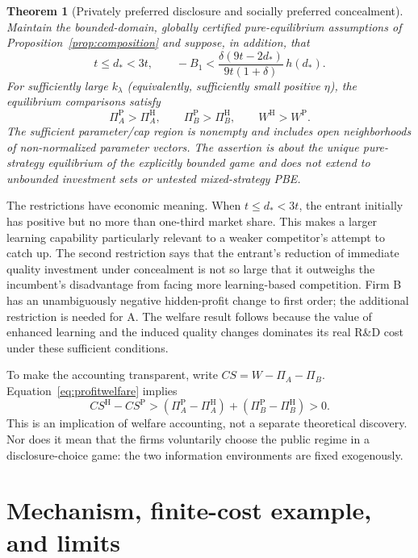 \documentclass[11pt,a4paper]{article}
\numberwithin{equation}{section}
\newtheorem{theorem}{Theorem}
\theoremstyle{remark}
\newcommand{\PP}{\mathrm{P}}
\newcommand{\HH}{\mathrm{H}}
\newcommand{\kl}{k_{\lambda}}
\begin{document}
\begin{theorem}[Privately preferred disclosure and socially preferred concealment]\label{thm:main}
Maintain the \emph{bounded-domain, globally certified pure-equilibrium} assumptions of Proposition~\ref{prop:composition} and suppose, in addition, that
\begin{equation}
t\le d_*<3t,\qquad
-B_1<
\frac{\delta(9t-2d_*)}{9t(1+\delta)}\,h(d_*).
\label{eq:Acondition}
\end{equation}
For sufficiently large $\kl$ (equivalently, sufficiently small positive $\eta$), the equilibrium comparisons satisfy
\begin{equation}
 \Pi_A^{\PP}>\Pi_A^{\HH},\qquad
 \Pi_B^{\PP}>\Pi_B^{\HH},\qquad
 W^{\HH}>W^{\PP}. \label{eq:profitwelfare}
\end{equation}
The sufficient parameter/cap region is nonempty and includes open neighborhoods of non-normalized parameter vectors. The assertion is about the unique pure-strategy equilibrium of the \emph{explicitly bounded} game and does not extend to unbounded investment sets or untested mixed-strategy PBE.
\end{theorem}

The restrictions have economic meaning. When $t\le d_*<3t$, the entrant initially has positive but no more than one-third market share. This makes a larger learning capability particularly relevant to a weaker competitor's attempt to catch up. The second restriction says that the entrant's reduction of immediate quality investment under concealment is not so large that it outweighs the incumbent's disadvantage from facing more learning-based competition. Firm B has an unambiguously negative hidden-profit change to first order; the additional restriction is needed for A. The welfare result follows because the value of enhanced learning and the induced quality changes dominates its real R\&D cost under these sufficient conditions.

To make the accounting transparent, write $CS=W-\Pi_A-\Pi_B$. Equation~\eqref{eq:profitwelfare} implies
\begin{equation}
 CS^{\HH}-CS^{\PP}>
 (\Pi_A^{\PP}-\Pi_A^{\HH})+
 (\Pi_B^{\PP}-\Pi_B^{\HH})>0. \label{eq:cs}
\end{equation}
This is an implication of welfare accounting, not a separate theoretical discovery. Nor does it mean that the firms voluntarily choose the public regime in a disclosure-choice game: the two information environments are fixed exogenously.

\section{Mechanism, finite-cost example, and limits}\label{sec:mechanism}
\end{document}
